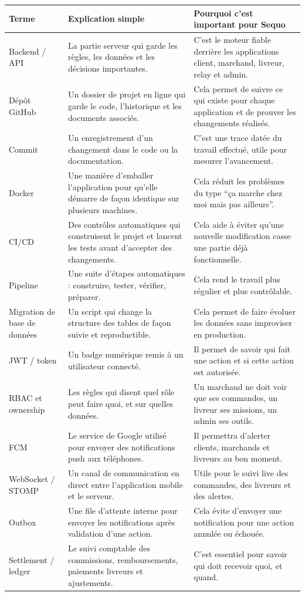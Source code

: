 \documentclass[11pt,letterpaper]{article}
\begin{document}
{\small
\begin{tabularx}{\linewidth}{@{}L{3.4cm}Y Y@{}}
\toprule
{}
\textbf{Terme} & \textbf{Explication simple} & \textbf{Pourquoi c'est important pour Sequo} \\
\midrule
Backend / API & La partie serveur qui garde les règles, les données et les décisions importantes. & C'est le moteur fiable derrière les applications client, marchand, livreur, relay et admin. \\
Dépôt GitHub & Un dossier de projet en ligne qui garde le code, l'historique et les documents associés. & Cela permet de suivre ce qui existe pour chaque application et de prouver les changements réalisés. \\
Commit & Un enregistrement d'un changement dans le code ou la documentation. & C'est une trace datée du travail effectué, utile pour mesurer l'avancement. \\
Docker & Une manière d'emballer l'application pour qu'elle démarre de façon identique sur plusieurs machines. & Cela réduit les problèmes du type ``ça marche chez moi mais pas ailleurs''. \\
CI/CD & Des contrôles automatiques qui construisent le projet et lancent les tests avant d'accepter des changements. & Cela aide à éviter qu'une nouvelle modification casse une partie déjà fonctionnelle. \\
Pipeline & Une suite d'étapes automatiques : construire, tester, vérifier, préparer. & Cela rend le travail plus régulier et plus contrôlable. \\
Migration de base de données & Un script qui change la structure des tables de façon suivie et reproductible. & Cela permet de faire évoluer les données sans improviser en production. \\
JWT / token & Un badge numérique remis à un utilisateur connecté. & Il permet de savoir qui fait une action et si cette action est autorisée. \\
RBAC et ownership & Les règles qui disent quel rôle peut faire quoi, et sur quelles données. & Un marchand ne doit voir que ses commandes, un livreur ses missions, un admin ses outils. \\
FCM & Le service de Google utilisé pour envoyer des notifications push aux téléphones. & Il permettra d'alerter clients, marchands et livreurs au bon moment. \\
WebSocket / STOMP & Un canal de communication en direct entre l'application mobile et le serveur. & Utile pour le suivi live des commandes, des livreurs et des alertes. \\
Outbox & Une file d'attente interne pour envoyer les notifications après validation d'une action. & Cela évite d'envoyer une notification pour une action annulée ou échouée. \\
Settlement / ledger & Le suivi comptable des commissions, remboursements, paiements livreurs et ajustements. & C'est essentiel pour savoir qui doit recevoir quoi, et quand. \\
\bottomrule
\end{tabularx}
}
\end{document}
